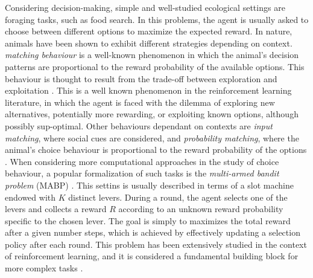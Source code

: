 Considering decision-making, simple and well-studied ecological settings are foraging tasks, such as food search. In this problems, the agent is usually asked to choose between different options to maximize the expected reward.
In nature, animals have been shown to exhibit different strategies depending on context.
\textit{matching behaviour} is a well-known phenomenon in which the animal's decision patterns are proportional to the reward probability of the available options.
This behaviour is thought to result from the trade-off between exploration and exploitation \cite{suttonReinforcementLearningProblem1998, nivEvolutionReinforcementLearning2002}.
This is a well known phenomenon in the reinforcement learning literature, in which the agent is faced with the dilemma of exploring new alternatives, potentially more rewarding, or exploiting known options, although possibly sup-optimal.
Other behaviours dependant on contexts are \textit{input matching}, where social cues are considered, and \textit{probability matching}, where the animal's choice behaviour is proportional to the reward probability of the options \cite{bariDynamicDecisionMaking2021, houstonMatchingBehavioursRewards2021}.
When considering more computational approaches in the study of choice behaviour, a popular formalization of such tasks is the \textit{multi-armed bandit problem} (MABP) \cite{averbeckTheoryChoiceBandit2015}. This settins is usually described in terms of a slot machine endowed with $K$ distinct levers.
During a round, the agent selects one of the levers and collects a reward $R$ according to an unknown reward probability specific to the chosen lever.
The goal is simply to maximizes the total reward after a given number steps, which is achieved by effectively updating a selection policy after each round.
This problem has been extensively studied in the context of reinforcement learning, and it is considered a fundamental building block for more complex tasks \cite{suttonReinforcementLearningProblem1998}.

